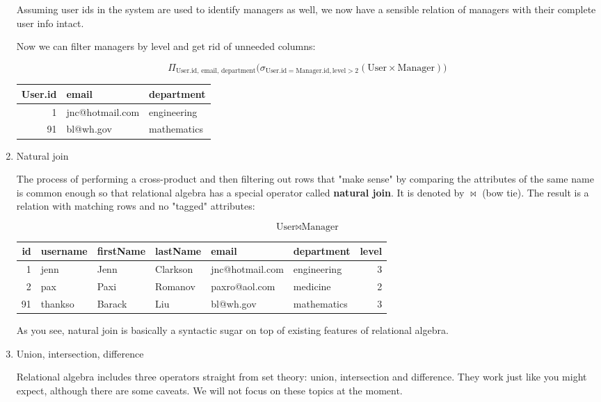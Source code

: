 \documentclass[a4paper, justified, notitlepage, sfsidenotes, notoc]{tufte-book}
\begin{document}
\begin{enumerate}
Assuming user ids in the system are used to identify managers as well, we now have a sensible relation of managers with their complete user info intact.

Now we can filter managers by level and get rid of unneeded columns:


\begin{equation}
\Pi_{\textrm{User.id, email, department}}
\big(
\sigma_{\textrm{User.id} = \textrm{Manager.id}, \textrm{level} > 2} (\textrm{User} \times \textrm{Manager})
\big)
\end{equation}

\begin{center}
\begin{tabular}{rll}
User.id & email & department\\
\hline
1 & jnc@hotmail.com & engineering\\
91 & bl@wh.gov & mathematics\\
\end{tabular}
\end{center}

\item Natural join
\label{sec:org1c50a49}

The process of performing a cross-product and then filtering out rows that "make sense" by comparing the attributes of the same name is common enough so that relational algebra has a special operator called \textbf{natural join}. It is denoted by \(\bowtie\) (bow tie). The result is a relation with matching rows and no "tagged" attributes:

\begin{equation}
\textrm{User} \bowtie \textrm{Manager}
\end{equation}

\begin{center}
\begin{tabular}{rlllllr}
id & username & firstName & lastName & email & department & level\\
\hline
1 & jenn & Jenn & Clarkson & jnc@hotmail.com & engineering & 3\\
2 & pax & Paxi & Romanov & paxro@aol.com & medicine & 2\\
91 & thankso & Barack & Liu & bl@wh.gov & mathematics & 3\\
\end{tabular}
\end{center}

As you see, natural join is basically a syntactic sugar on top of existing features of relational algebra.

\item Union, intersection, difference
\label{sec:org7c228cb}

Relational algebra includes three operators straight from set theory: union, intersection and difference. They work just like you might expect, although there are some caveats. We will not focus on these topics at the moment.
\end{enumerate}
\end{document}
